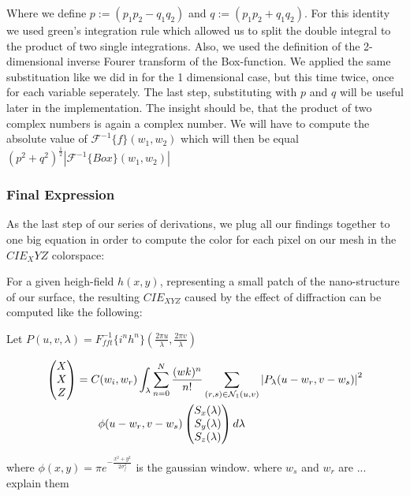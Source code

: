 Where we define $p := (p_1 p_2 - q_1 q_2) $ and $q := (p_1 p_2 + q_1 q_2)$. For this identity we used green's integration rule which allowed us to split the double integral to the product of two single integrations. Also, we used the definition of the 2-dimensional inverse Fourer transform of the Box-function. We applied the same substituation like we did in for the 1 dimensional case, but this time twice, once for each variable seperately. The last step, substituting with $p$ and $q$ will be useful later in the implementation. The insight should be, that the product of two complex numbers is again a complex number. We will have to compute the absolute value of $\mathcal{F}^{-1}\{f\}(w_1,w_2)$ which will then be equal $(p^2 + q^2)^{\frac{1}{2}}\left|\mathcal{F}^{-1}\{Box\}(w_1,w_2)\right|$

\subsubsection{Final Expression}
As the last step of our series of derivations, we plug all our findings together to one big equation in order to compute the color for each pixel on our mesh in the $CIE_XYZ$ colorspace:

For a given heigh-field $h(x,y)$, representing a small patch of the nano-structure of our surface, the resulting $CIE_{XYZ}$ caused by the effect of diffraction can be computed like the following: 

Let $P(u,v,\lambda) = {F}_{fft}^{-1}\{i^n h^n\}(\frac{2\pi u}{\lambda},\frac{2\pi v}{\lambda})$

\begin{equation}
\begin{split}
\colvec[X]{X}{Z}& = C(w_i,w_r) \int_{\lambda} \sum_{n=0}^N  \frac{(wk)^n}{n!} \sum_{(r,s) \in \mathcal{N}_1(u,v)} \left| P_{\lambda}(u-w_r,v-w_s) \right|^2 \\
& \quad \quad  \phi(u-w_r, v-w_s) \colvec[S_x(\lambda)]{S_y(\lambda)}{S_z(\lambda)}d\lambda
\end{split}
\end{equation}

where $\phi(x,y) = \pi e^{-\frac{x^2 + y^2}{2\sigma_{f}^2}}$ is the gaussian window.
where $w_s$ and $w_r$ are ... explain them

